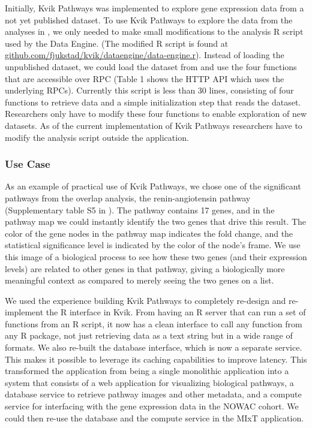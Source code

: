 Initially, Kvik Pathways was implemented to explore gene expression data
from a not yet published dataset. To use Kvik Pathways to explore the data
from the analyses in \cite{olsen2013plasma}, we only needed to make small
modifications to the analysis R script used by the Data Engine. (The modified R
script is found at
\href{github.com/fjukstad/kvik/dataengine/data-engine.r}{github.com/fjukstad/kvik/dataengine/data-engine.r}).
Instead of loading the unpublished dataset, we could load the dataset from
\cite{olsen2013plasma} and use the four functions that are accessible over RPC (Table 1
shows the HTTP API which uses the underlying RPCs).
Currently this script is less than 30 lines, consisting of four functions to
retrieve data and a simple initialization step that reads the dataset. 
Researchers only
have to modify these four functions to enable exploration of new datasets. As of 
the current implementation of Kvik Pathways researchers have to modify the analysis script 	
outside the application.

\subsubsection{Use Case}
As an example of practical use of Kvik Pathways, we chose one of the
significant pathways from the overlap analysis, the renin-angiotensin
pathway (Supplementary table S5 in \cite{olsen2013plasma}). The pathway
contains 17 genes, and in the pathway map we could instantly identify the
two genes that drive this result. The color of the gene nodes in the pathway
map indicates the fold change, and the statistical significance level is
indicated by the color of the node's frame.  We use this image of a
biological process to see how these two genes (and their expression levels)
are related to other genes in that pathway, giving a biologically more
meaningful context as compared to merely seeing the two genes on a list.

We used the experience building Kvik Pathways to completely re-design and
re-implement the R interface in Kvik. From having an R server that can run a
set of functions from an R script, it now has a clean interface to call any
function from any R package, not just retrieving data as a text string but in a
wide range of formats. We also re-built the database interface, which is now a
separate service. This makes it possible to leverage its caching capabilities
to improve latency. This transformed the application from being a single
monolithic application into a system that consists of a web application for
visualizing biological pathways, a database service to retrieve pathway images
and other metadata, and a compute service for interfacing with the gene
expression data in the NOWAC cohort. We could then re-use the database and the
compute service in the MIxT application. 


